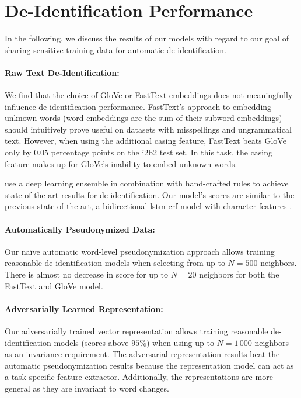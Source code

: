 \section{De-Identification Performance}

In the following, we discuss the results of our models with regard to our goal of sharing sensitive training data for automatic de-identification.

\paragraph{Raw Text De-Identification:}
%
We find that the choice of GloVe or FastText embeddings does not meaningfully influence de-identification performance.
%
FastText's approach to embedding unknown words (word embeddings are the sum of their subword embeddings) should intuitively prove useful on datasets with misspellings and ungrammatical text.
%
However, when using the additional casing feature, FastText beats GloVe only by $0.05$ percentage points on the i2b2 test set.
%
In this task, the casing feature makes up for GloVe's inability to embed unknown words.

%
\citet{liu2017identification} use a deep learning ensemble in combination with hand-crafted rules to achieve state-of-the-art results for de-identification.
%
Our model's scores are similar to the previous state of the art, a bidirectional \ac{lstm}-\ac{crf} model with character features \citep{dernoncourt2017identification}.

\paragraph{Automatically Pseudonymized Data:}
%
Our naïve automatic word-level pseudonymization approach allows training reasonable de-iden\-tification models when selecting from up to $N=500$ neighbors.
%
There is almost no decrease in \fone score for up to $N = 20$ neighbors for both the FastText and GloVe model.

\paragraph{Adversarially Learned Representation:}
%
Our adversarially trained vector representation allows training reasonable de-identification models (\fone scores above $95\%$) when using up to $N=1\,000$ neighbors as an invariance requirement.
%
The adversarial representation results beat the automatic pseudonymization results because the representation model can act as a task-specific feature extractor.
%
Additionally, the representations are more general as they are invariant to word changes.


